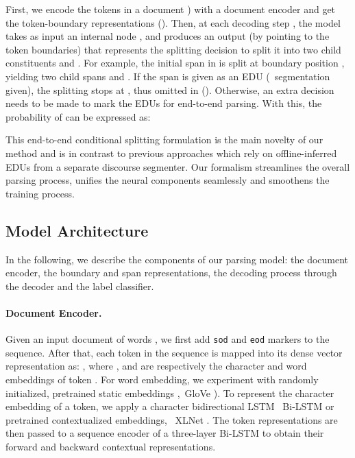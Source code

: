 First, we encode the tokens in a document ) with a document encoder and get the token-boundary representations (). Then, at each decoding step , the model takes as input an internal node , and produces an output  (by pointing to the token boundaries) that represents the splitting decision  to split it into two child constituents  and . For example, the initial span  in    is split at boundary position , yielding two child spans  and . If the span  is given as an EDU (\ie\  segmentation given), the splitting stops at , thus omitted in  (). Otherwise, an extra decision  needs to be made to mark the EDUs for end-to-end parsing. With this,
the probability of  can be expressed as:

\small 

\normalsize

\noindent This end-to-end conditional splitting formulation is the main novelty of our method and is in  contrast to previous approaches which rely on offline-inferred EDUs from a separate discourse segmenter. Our formalism streamlines the overall parsing process, unifies the neural components seamlessly and smoothens the training process. 

\subsection{Model Architecture} 

In the following, we describe the components of our parsing model: the document encoder, the boundary and span representations, the decoding process through the decoder and the label classifier.

\paragraph{Document Encoder.}
Given an input document of  words , we first add \texttt{{sod}} and \texttt{{eod}} markers to the  sequence. After that, each token  in the sequence is mapped into its dense vector representation  as: , where , and  are respectively the character and word embeddings of token .  For word embedding, we experiment with \Ni randomly initialized, \Nii pretrained static embeddings ,\eg\ GloVe \citep{pennington2014glove}). To represent the character embedding of a token, we apply a character bidirectional LSTM \ie\ Bi-LSTM \citep{Hochreiter:1997} or pretrained contextualized embeddings, \eg\ XLNet \citep{NEURIPS2019_dc6a7e65}.  The token representations are then passed to a sequence encoder of a three-layer Bi-LSTM  to obtain their forward  and backward  contextual representations. 

